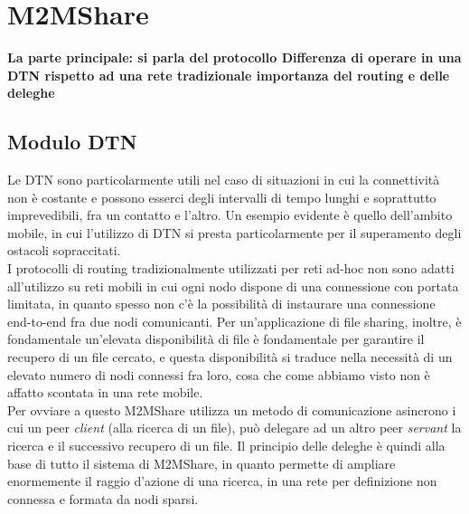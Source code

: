 
\chapter{M2MShare}\label{m2mshare} %





\textbf{La parte principale: si parla del protocollo
Differenza di operare in una DTN rispetto ad una rete tradizionale
importanza del routing e delle deleghe}
\\


\section{Modulo DTN}
Le DTN sono particolarmente utili nel caso di situazioni in cui la connettività non \`{e} costante e possono esserci degli intervalli di tempo lunghi e soprattutto imprevedibili, fra un contatto e l'altro. Un esempio evidente \`{e} quello dell'ambito mobile, in cui l'utilizzo di DTN si presta particolarmente per il superamento degli ostacoli sopraccitati.
\\

I protocolli di routing tradizionalmente utilizzati per reti ad-hoc non sono adatti all'utilizzo su reti mobili in cui ogni nodo dispone di una connessione con portata limitata, in quanto spesso non c'\`{e} la possibilità di instaurare una connessione end-to-end fra due nodi comunicanti. Per un'applicazione di file sharing, inoltre, \`{e} fondamentale un'elevata disponibilità di file \`{e} fondamentale per garantire il recupero di un file cercato, e questa disponibilità si traduce nella necessità di un elevato numero di nodi connessi fra loro, cosa che come abbiamo visto non \`{e} affatto scontata in una rete mobile.
\\

Per ovviare a questo M2MShare utilizza un metodo di comunicazione asincrono i cui un peer \textit{client} (alla ricerca di un file), pu\`{o} delegare ad un altro peer \textit{servant} la ricerca e il successivo recupero di un file. Il principio delle deleghe \`{e} quindi alla base di tutto il sistema di M2MShare, in quanto permette di ampliare enormemente il raggio d'azione di una ricerca, in una rete per definizione non connessa e formata da nodi sparsi.
\\

